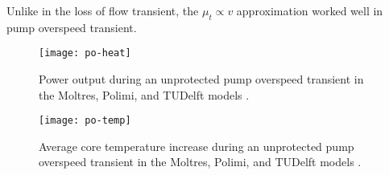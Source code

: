 Unlike in the loss of flow transient, the $\mu_t \propto v$ approximation
worked well in pump overspeed transient.

\begin{figure}[htbp!]
    \centering
    \texttt{[image: po-heat]}
    \caption{Power output during
    an unprotected pump overspeed transient in the Moltres, Polimi, and
    TUDelft models \cite{fiorina_modelling_2014}.}
    \label{fig:poheat}
    \texttt{[image: po-temp]}
    \caption{Average core temperature increase during
    an unprotected pump overspeed transient in the Moltres, Polimi, and
    TUDelft models \cite{fiorina_modelling_2014}.}
    \label{fig:potemp}
\end{figure}
